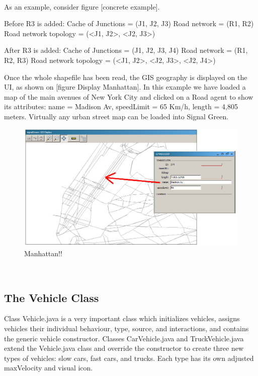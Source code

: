 \documentclass[11pt]{article}
\begin{document}
\\
As an example, consider figure [concrete example].

Before R3 is added:
Cache of Junctions = (J1, J2, J3)
Road network = (R1, R2)
Road network topology = (<J1, J2>, <J2, J3>)

After R3 is added:
Cache of Junctions = (J1, J2, J3, J4)
Road network = (R1, R2, R3)
Road network topology = (<J1, J2>, <J2, J3>, <J2, J4>)

Once the whole shapefile has been read, the GIS geography is displayed on the UI, as shown on [figure Display Manhattan]. In this example we have loaded a map of the main avenues of New York City and clicked on a Road agent to show its attributes: name = Madison Av, speedLimit = 65 Km/h, length = 4,805 meters. Virtually any urban street map can be loaded into Signal Green.
\\

\begin{figure}[h]
\begin{center}
\includegraphics[scale=0.4]{GIS_display_manhattan_loaded}
\caption{Manhattan!!}
\end{center}
\end{figure}
\\

\subsection{The Vehicle Class}


Class Vehicle.java is a very important class which initializes vehicles, assigns vehicles their individual behaviour, type, source, and interactions, and contains the generic vehicle constructor. Classes CarVehicle.java and TruckVehicle.java extend the Vehicle.java class and override the constructor to create three new types of vehicles: slow cars, fast cars, and trucks. Each type has its own adjusted maxVelocity and visual icon. 
\end{document}
